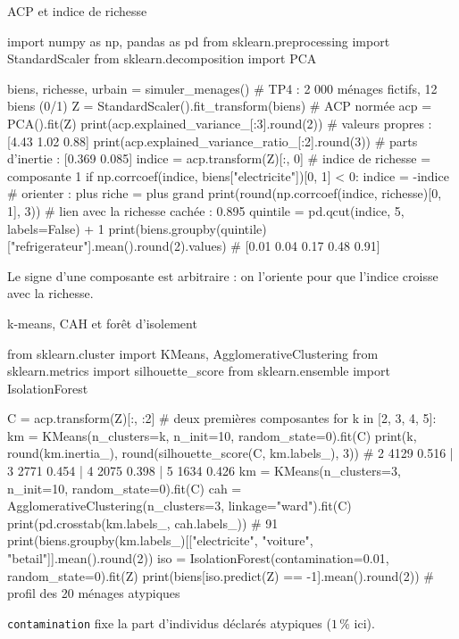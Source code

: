 \documentclass[aspectratio=169,11pt]{beamer}
\begin{document}
\begin{frame}[fragile]{ACP et indice de richesse}
\begin{python}[basicstyle=\ttfamily\scriptsize]
import numpy as np, pandas as pd
from sklearn.preprocessing import StandardScaler
from sklearn.decomposition import PCA

biens, richesse, urbain = simuler_menages()      # TP4 : 2 000 ménages fictifs, 12 biens (0/1)
Z = StandardScaler().fit_transform(biens)        # ACP normée
acp = PCA().fit(Z)
print(acp.explained_variance_[:3].round(2))      # valeurs propres : [4.43 1.02 0.88]
print(acp.explained_variance_ratio_[:2].round(3))  # parts d'inertie : [0.369 0.085]
indice = acp.transform(Z)[:, 0]                  # indice de richesse = composante 1
if np.corrcoef(indice, biens["electricite"])[0, 1] < 0:
    indice = -indice                             # orienter : plus riche = plus grand
print(round(np.corrcoef(indice, richesse)[0, 1], 3))   # lien avec la richesse cachée : 0.895
quintile = pd.qcut(indice, 5, labels=False) + 1
print(biens.groupby(quintile)["refrigerateur"].mean().round(2).values)
# [0.01 0.04 0.17 0.48 0.91]
\end{python}
\vskip-1mm
{\small\color{cnfGris}Le signe d'une composante est arbitraire : on l'oriente pour que l'indice croisse avec la richesse.}
\end{frame}

\begin{frame}[fragile]{k-means, CAH et forêt d'isolement}
\begin{python}[basicstyle=\ttfamily\scriptsize]
from sklearn.cluster import KMeans, AgglomerativeClustering
from sklearn.metrics import silhouette_score
from sklearn.ensemble import IsolationForest

C = acp.transform(Z)[:, :2]                      # deux premières composantes
for k in [2, 3, 4, 5]:
    km = KMeans(n_clusters=k, n_init=10, random_state=0).fit(C)
    print(k, round(km.inertia_), round(silhouette_score(C, km.labels_), 3))
# 2 4129 0.516 | 3 2771 0.454 | 4 2075 0.398 | 5 1634 0.426
km = KMeans(n_clusters=3, n_init=10, random_state=0).fit(C)
cah = AgglomerativeClustering(n_clusters=3, linkage="ward").fit(C)
print(pd.crosstab(km.labels_, cah.labels_))      # 91 %
print(biens.groupby(km.labels_)[["electricite", "voiture", "betail"]].mean().round(2))
iso = IsolationForest(contamination=0.01, random_state=0).fit(Z)
print(biens[iso.predict(Z) == -1].mean().round(2))     # profil des 20 ménages atypiques
\end{python}
\vskip-1mm
{\small\color{cnfGris}\texttt{contamination} fixe la part d'individus déclarés atypiques ($1\,\%$ ici).}
\end{frame}
\end{document}
